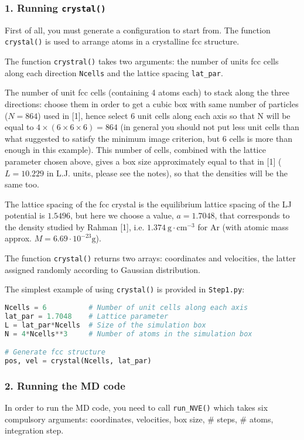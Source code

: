 \documentclass[12pt]{article}
\begin{document}
\subsubsection*{1. Running \texttt{crystal()}}
First of all, you must generate a configuration to start from.
The function \verb!crystal()! is used to arrange atoms in a crystalline fcc
structure.

The function \verb!crystral()! takes two arguments:
the number of units fcc cells along each direction \verb!Ncells! and 
the lattice spacing \verb!lat_par!.

The number of unit fcc cells (containing 4 atoms each) to stack along the
three directions: choose them in order to get a cubic box with same number of
particles ($N=864$) used in [1], hence select 6 unit cells along each axis so
that N will be equal to $4 \times (6 \times 6 \times 6) = 864$ (in general you
should not put less unit cells than what suggested to satisfy the minimum image
criterion, but 6 cells is more than enough in this example).  This number of
cells, combined with the lattice parameter chosen above, gives a box size
approximately equal to that in [1] ($L=10.229$ in L.J. units, please see the
notes), so that the densities will be the same too.

The lattice spacing of the fcc crystal is the equilibrium lattice spacing of
the LJ potential is $1.5496$, but here we choose a value, $a=1.7048$, that
corresponds to the density studied by Rahman [1], i.e.  $1.374~\mathrm{g\cdot
cm}^{-3}$ for Ar (with atomic mass approx.  $M = 6.69\cdot10^{-23} \mathrm{g}$).

The function \verb!crystal()! returns two arrays: coordinates and velocities, the
latter assigned randomly according to Gaussian distribution.

The simplest example of using \verb!crystal()! is provided in \verb!Step1.py!:
\begin{lstlisting}[language=python]
Ncells = 6          # Number of unit cells along each axis
lat_par = 1.7048    # Lattice parameter
L = lat_par*Ncells  # Size of the simulation box
N = 4*Ncells**3     # Number of atoms in the simulation box

# Generate fcc structure
pos, vel = crystal(Ncells, lat_par)
\end{lstlisting}



\subsubsection*{2. Running the MD code}
In order to run the MD code, you need to call \verb!run_NVE()! which takes six
compulsory arguments: coordinates, velocities, box size, \# steps, \# atoms, integration step.
\end{document}
